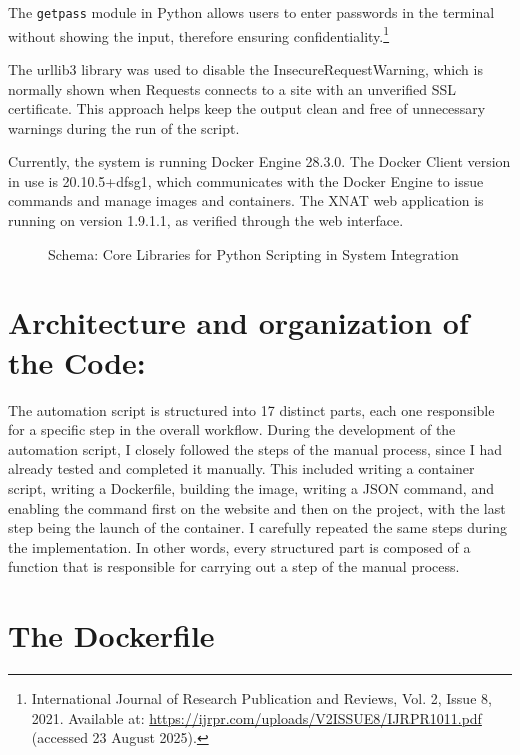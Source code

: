 The \texttt{getpass} module in Python allows users to enter passwords in the terminal without showing the input, therefore ensuring confidentiality.\footnote{International Journal of Research Publication and Reviews, Vol. 2, Issue 8, 2021. Available at: \url{https://ijrpr.com/uploads/V2ISSUE8/IJRPR1011.pdf} (accessed 23 August 2025).}


The urllib3 library was used to disable the InsecureRequestWarning, which is normally shown when Requests connects to a site with an unverified SSL certificate. This approach helps keep the output clean and free of unnecessary warnings during the run of the script.

Currently, the system is running Docker Engine 28.3.0. The Docker Client version in use is 20.10.5+dfsg1, which communicates with the Docker Engine to issue commands and manage images and containers. The XNAT web application is running on version 1.9.1.1, as verified through the web interface.


\begin{figure}[ht]
  \centering
  \def\svgwidth{0.8\linewidth}
  
  \caption{Schema: Core Libraries for Python Scripting in System Integration}
  \label{fig:diagram-core-libraries}
\end{figure}






\section{Architecture and organization of the Code:}
The automation script is structured into 17 distinct parts, each one responsible for a specific step in the overall workflow.
During the development of the automation script, I closely followed the steps of the manual process, since I had already tested and completed it manually. This included writing a container script, writing a Dockerfile, building the image, writing a JSON command, and enabling the command first on the website and then on the project, with the last step being the launch of the container. I carefully repeated the same steps during the implementation. In other words, every structured part is composed of a function that is responsible for carrying out a step of the manual process.
 
 \section{The Dockerfile}
 
